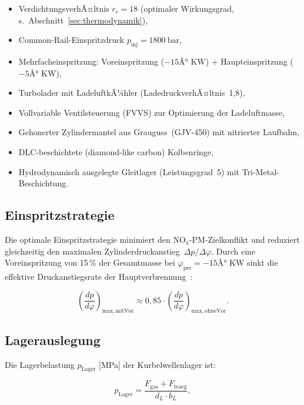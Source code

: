 ﻿\documentclass[12pt,a4paper]{article}
\newcommand{\NOx}{\ensuremath{\mathrm{NO_x}}}
\newcommand{\rc}{\ensuremath{r_c}}
\begin{document}
\begin{itemize}
  \item VerdichtungsverhÃ¤ltnis $\rc = 18$ (optimaler Wirkungsgrad, s.\
        Abschnitt~\ref{sec:thermodynamik}),
  \item Common-Rail-Einspritzdruck $p_{\mathrm{inj}} = \SI{1800}{\bar}$,
  \item Mehrfacheinspritzung: Voreinspritzung ($-15Â°$ KW) + Haupteinspritzung ($-5Â°$ KW),
  \item Turbolader mit LadeluftkÃ¼hler (LadedruckverhÃ¤ltnis~1{,}8),
  \item Vollvariable Ventilsteuerung (FVVS) zur Optimierung der Ladeluftmasse,
  \item Gehonerter Zylindermantel aus Grauguss~(GJV-450) mit nitrierter Laufbahn,
  \item DLC-beschichtete (diamond-like carbon) Kolbenringe,
  \item Hydrodynamisch ausgelegte Gleitlager (Leistungsgrad~5) mit
        Tri-Metal-Beschichtung.
\end{itemize}

\subsection{Einspritzstrategie}
\label{sec:motor_einspritzung}

Die optimale Einspritzstrategie minimiert den $\NOx$-PM-Zielkonflikt und
reduziert gleichzeitig den maximalen Zylinderdruckanstieg~$\Delta p / \Delta\varphi$.
Durch eine Voreinspritzung von 15\,\% der Gesamtmasse bei $\varphi_{\mathrm{pre}} = -15Â°$ KW
sinkt die effektive Druckanstiegsrate der Hauptverbrennung~\cite{mollenhauer2010}:

\begin{equation}
  \left(\frac{dp}{d\varphi}\right)_{\mathrm{max, mit Vor}} \approx
  0{,}85 \cdot \left(\frac{dp}{d\varphi}\right)_{\mathrm{max, ohne Vor}}.
\end{equation}

\subsection{Lagerauslegung}
\label{sec:motor_lager}

Die Lagerbelastung $p_{\mathrm{Lager}}$ [\si{\MPa}] der Kurbelwellenlager ist:

\begin{equation}
  p_{\mathrm{Lager}} = \frac{F_{\mathrm{gas}} + F_{\mathrm{traeg}}}{d_L \cdot b_L},
  \label{eq:lager_belastung}
\end{equation}
\end{document}
